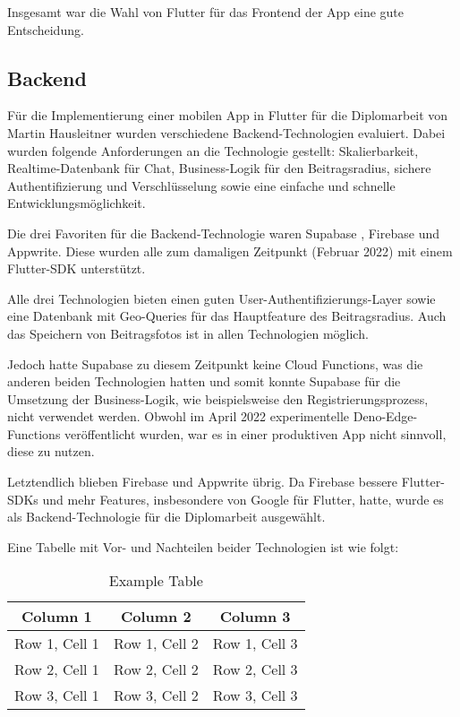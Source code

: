 Insgesamt war die Wahl von Flutter für das Frontend der App eine gute Entscheidung.

\subsection
{Backend}

Für die Implementierung einer mobilen App in Flutter für die Diplomarbeit von Martin Hausleitner wurden verschiedene Backend-Technologien evaluiert. Dabei wurden folgende Anforderungen an die Technologie gestellt: Skalierbarkeit, Realtime-Datenbank für Chat, Business-Logik für den Beitragsradius, sichere Authentifizierung und Verschlüsselung sowie eine einfache und schnelle Entwicklungsmöglichkeit.

Die drei Favoriten für die Backend-Technologie waren Supabase \cite{supabase}, Firebase\cite{firabase} und Appwrite\cite{appwrite}. Diese wurden alle zum damaligen Zeitpunkt (Februar 2022) mit einem Flutter-SDK unterstützt.

Alle drei Technologien bieten einen guten User-Authentifizierungs-Layer sowie eine Datenbank mit Geo-Queries für das Hauptfeature des Beitragsradius. Auch das Speichern von Beitragsfotos ist in allen Technologien möglich.

Jedoch hatte Supabase zu diesem Zeitpunkt keine Cloud Functions, was die anderen beiden Technologien hatten und somit konnte Supabase für die Umsetzung der Business-Logik, wie beispielsweise den Registrierungsprozess, nicht verwendet werden. Obwohl im April 2022 experimentelle Deno-Edge-Functions veröffentlicht wurden, war es in einer produktiven App nicht sinnvoll, diese zu nutzen.

Letztendlich blieben Firebase und Appwrite übrig. Da Firebase bessere Flutter-SDKs und mehr Features, insbesondere von Google für Flutter, hatte, wurde es als Backend-Technologie für die Diplomarbeit ausgewählt.

Eine Tabelle mit Vor- und Nachteilen beider Technologien ist wie folgt:

\begin{table}
    \centering
    \begin{tabular}{|c|c|c|}
        \hline
        \textbf{Column 1} & \textbf{Column 2} & \textbf{Column 3} \\ \hline
        Row 1, Cell 1     & Row 1, Cell 2     & Row 1, Cell 3     \\ \hline
        Row 2, Cell 1     & Row 2, Cell 2     & Row 2, Cell 3     \\ \hline
        Row 3, Cell 1     & Row 3, Cell 2     & Row 3, Cell 3     \\ \hline
    \end{tabular}
    \caption{Example Table}
    \label{tab:example}
\end{table}


